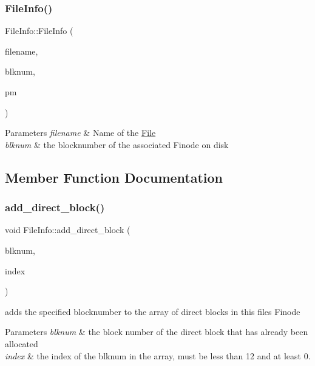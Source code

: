 \subsubsection{\texorpdfstring{File\+Info()}{FileInfo()}}
{\footnotesize\ttfamily File\+Info\+::\+File\+Info (\begin{DoxyParamCaption}\item[{string}]{filename,  }\item[{Blk\+Num\+Type}]{blknum,  }\item[{\mbox{\hyperlink{classPartitionManager}{Partition\+Manager}} $\ast$}]{pm }\end{DoxyParamCaption})}


\begin{DoxyParams}{Parameters}
{\em filename} & Name of the \mbox{\hyperlink{classFile}{File}} \\
\hline
{\em blknum} & the blocknumber of the associated Finode on disk \\
\hline
\end{DoxyParams}


\subsection{Member Function Documentation}
\mbox{\label{classFileInfo_a1537d2ac2b5c170d144911c8337c81bc}} 
\subsubsection{\texorpdfstring{add\+\_\+direct\+\_\+block()}{add\_direct\_block()}}
{\footnotesize\ttfamily void File\+Info\+::add\+\_\+direct\+\_\+block (\begin{DoxyParamCaption}\item[{Blk\+Num\+Type}]{blknum,  }\item[{int}]{index }\end{DoxyParamCaption})}

adds the specified blocknumber to the array of direct blocks in this file\textquotesingle{}s Finode 
\begin{DoxyParams}{Parameters}
{\em blknum} & the block number of the direct block that has already been allocated \\
\hline
{\em index} & the index of the blknum in the array, must be less than 12 and at least 0. \\
\hline
\end{DoxyParams}

